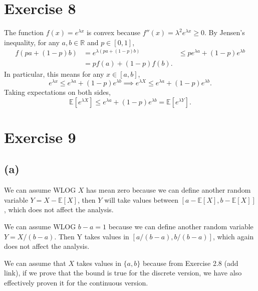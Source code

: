 \newpage
\section*{Exercise 8}
The function $f(x) = e^{\lambda x}$ is convex because $f''(x) = \lambda^2 e^{\lambda x} \geq 0$. By 
Jensen's inequality, for any $a, b \in \mathbb{R}$ and $p \in [0, 1]$, 
\begin{align*}
	f(pa + (1 - p)b) 
	&= e^{\lambda(pa + (1 - p)b)} 
	&\leq p e^{\lambda a} + (1 - p) e^{\lambda b} \\
	&= pf(a) + (1 - p)f(b).
\end{align*}
In particular, this means for any $x \in [a, b]$, 
\[ e^{\lambda x} \leq e^{\lambda a} + (1 - p) e^{\lambda b} 
\implies e^{\lambda X} \leq e^{\lambda a} + (1 - p) e^{\lambda b}. \]
Taking expectations on both sides, 
\[ \mathbb{E}[e^{\lambda X}] \leq e^{\lambda a} + (1 - p) e^{\lambda b} = \mathbb{E}[e^{\lambda Y}]. \]


\newpage
\section*{Exercise 9}
\subsection*{(a)}
We can assume WLOG $X$ has mean zero because we can define another random variable $Y = X - \mathbb{E}[X]$, 
then $Y$ will take values between $[a - \mathbb{E}[X], b - \mathbb{E}[X]]$, which does not affect the 
analysis. 

We can assume WLOG $b - a = 1$ because we can define another random variable $Y = X / (b - a)$. Then 
Y takes values in $[a / (b - a), b / (b - a)]$, which again does not affect the analysis.

We can assume that $X$ takes values in $\{a, b\}$ because from Exercise 2.8 (add link), if we prove that 
the bound is true for the discrete version, we have also effectively proven it for the continuous version.

